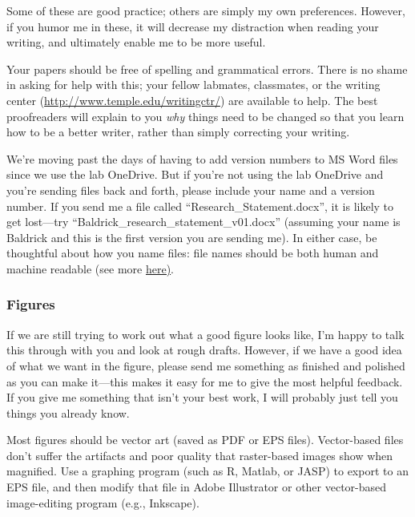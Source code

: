 \documentclass[letterpaper,11pt,oneside]{memoir}
\begin{document}
Some of these are good practice; others are simply my own preferences. However, if you humor me in these, it will decrease my distraction when reading your writing, and ultimately enable me to be more useful.

Your papers should be free of spelling and grammatical errors. There is no shame in asking for help with this; your fellow labmates, classmates, or the writing center (\url{http://www.temple.edu/writingctr/}) are available to help. The best proofreaders will explain to you \textit{why} things need to be changed so that you learn how to be a better writer, rather than simply correcting your writing. 


\begin{shaded}
\noindent We're moving past the days of having to add version numbers to MS Word files since we use the lab OneDrive. But if you're not using the lab OneDrive and you're sending files back and forth, please include your name and a version number. If you send me a file called ``Research\_Statement.docx'', it is likely to get lost---try ``Baldrick\_research\_statement\_v01.docx'' (assuming your name is Baldrick and this is the first version you are sending me). In either case, be thoughtful about how you name files: file names should be both human and machine readable (see more \href{http://www2.stat.duke.edu/~rcs46/lectures_2015/01-markdown-git/slides/naming-slides/naming-slides.pdf}{here)}.
\end{shaded}

\subsubsection{Figures}
If we are still trying to work out what a good figure looks like, I'm happy to talk this through with you and look at rough drafts. However, if we have a good idea of what we want in the figure, please send me something as finished and polished as you can make it---this makes it easy for me to give the most helpful feedback. If you give me something that isn't your best work, I will probably just tell you things you already know.

Most figures should be vector art (saved as PDF or EPS files). Vector-based files don't suffer the artifacts and poor quality that raster-based images show when magnified. Use a graphing program (such as R, Matlab, or JASP) to export to an EPS file, and then modify that file in Adobe Illustrator or other vector-based image-editing program (e.g., Inkscape).
\end{document}
